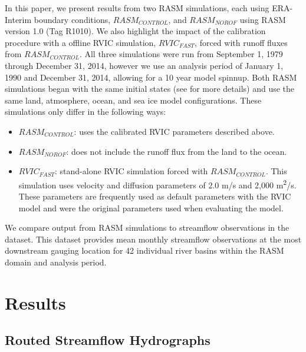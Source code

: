 \documentclass[jgrga, draft]{agutex}
\begin{document}
\begin{article}
In this paper, we present results from two RASM simulations, each using ERA-Interim boundary conditions, $RASM_{CONTROL}$, and $RASM_{NOROF}$ using RASM version 1.0 (Tag R1010).
We also highlight the impact of the calibration procedure with a offline RVIC simulation, $RVIC_{FAST}$, forced with runoff fluxes from $RASM_{CONTROL}$.
All three simulations were run from September 1, 1979 through December 31, 2014, however we use an analysis period of January 1, 1990 and December 31, 2014, allowing for a 10 year model spinnup.
Both RASM simulations began with the same initial states (see \citet{Hamman_2016} for more details) and use the same land, atmosphere, ocean, and sea ice model configurations.
These simulations only differ in the following ways:
\begin{itemize}
     \item $RASM_{CONTROL}$: uses the calibrated RVIC parameters described above.
     \item $RASM_{NOROF}$: does not include the runoff flux from the land to the ocean.
     \item $RVIC_{FAST}$: stand-alone RVIC simulation forced with $RASM_{CONTROL}$.
          This simulation uses velocity and diffusion parameters of 2.0 m/s and 2,000 m\textsuperscript{2}/s.
          These parameters are frequently used as default parameters with the RVIC model and were the original parameters used when evaluating the model.
\end{itemize}

We compare output from RASM simulations to streamflow observations in the \citet{Dai_2009} dataset.
This dataset provides mean monthly streamflow observations at the most downstream gauging location for 42 individual river basins within the RASM domain and analysis period.

\section{Results}

\subsection{Routed Streamflow Hydrographs}


\end{article}
\end{document}
